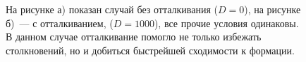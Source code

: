 \begin{figure}[h]
  \begin{minipage}[h]{0.45\linewidth}
  \end{minipage}
  \hfill
  \begin{minipage}[h]{0.45\linewidth}
  \end{minipage}
  \caption{На рисунке а) показан случай без отталкивания ($D=0$), на рисунке б)~--- с отталкиванием, ($D=1000$), все прочие условия одинаковы. В данном случае отталкивание помогло не только избежать столкновений, но и добиться быстрейшей сходимости к формации.}
\label{fig:formation-error}
\end{figure}


\clearpage

